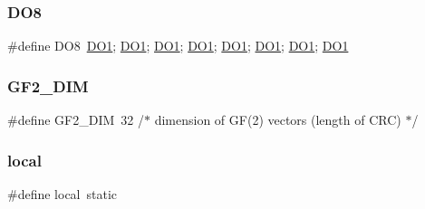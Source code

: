 \mbox{\label{third-party_2zlib_2crc32_8c_aed1b41414efee0773c67c28e09317455}} 
\subsubsection{\texorpdfstring{D\+O8}{DO8}}
{\footnotesize\ttfamily \#define D\+O8~\mbox{\hyperlink{third-party_2zlib_2crc32_8c_aff265ea9630e020c8ac850c18d5d972f}{D\+O1}}; \mbox{\hyperlink{third-party_2zlib_2crc32_8c_aff265ea9630e020c8ac850c18d5d972f}{D\+O1}}; \mbox{\hyperlink{third-party_2zlib_2crc32_8c_aff265ea9630e020c8ac850c18d5d972f}{D\+O1}}; \mbox{\hyperlink{third-party_2zlib_2crc32_8c_aff265ea9630e020c8ac850c18d5d972f}{D\+O1}}; \mbox{\hyperlink{third-party_2zlib_2crc32_8c_aff265ea9630e020c8ac850c18d5d972f}{D\+O1}}; \mbox{\hyperlink{third-party_2zlib_2crc32_8c_aff265ea9630e020c8ac850c18d5d972f}{D\+O1}}; \mbox{\hyperlink{third-party_2zlib_2crc32_8c_aff265ea9630e020c8ac850c18d5d972f}{D\+O1}}; \mbox{\hyperlink{third-party_2zlib_2crc32_8c_aff265ea9630e020c8ac850c18d5d972f}{D\+O1}}}

\mbox{\label{third-party_2zlib_2crc32_8c_a366ddceacb9041c5f12bb75fa6d75163}} 
\subsubsection{\texorpdfstring{G\+F2\+\_\+\+D\+IM}{GF2\_DIM}}
{\footnotesize\ttfamily \#define G\+F2\+\_\+\+D\+IM~32      /$\ast$ dimension of GF(2) vectors (length of C\+RC) $\ast$/}

\mbox{\label{third-party_2zlib_2crc32_8c_a08023ea6765c99d60a6a3840cd07156e}} 
\subsubsection{\texorpdfstring{local}{local}}
{\footnotesize\ttfamily \#define local~static}

